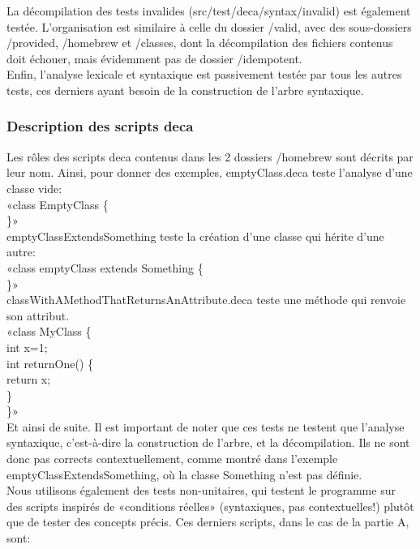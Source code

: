 \documentclass[a4paper]{article}
\begin{document}
La décompilation des tests invalides (src/test/deca/syntax/invalid) est également testée. L'organisation est similaire à celle du dossier /valid, avec des sous-dossiers /provided, /homebrew et  /classes, dont la décompilation des fichiers contenus doit échouer, mais évidemment pas de dossier /idempotent.\\

Enfin, l'analyse lexicale et syntaxique est passivement testée par tous les autres tests, ces derniers ayant besoin de la construction de l'arbre syntaxique.\\

\subsubsection{Description des scripts deca}

Les rôles des scripts deca contenus dans les 2 dossiers /homebrew sont décrits par leur nom.
Ainsi, pour donner des exemples, emptyClass.deca teste l'analyse d'une classe vide:\\
«class EmptyClass \{\\
\}»\\
emptyClassExtendsSomething teste la création d'une classe qui hérite d'une autre:\\
«class emptyClass extends Something \{\\
\}»\\
classWithAMethodThatReturnsAnAttribute.deca teste une méthode qui renvoie son attribut.\\
«class MyClass \{\\
\indent int x=1;\\
\indent int returnOne() \{\\
\indent \indent return x;\\
\indent \}\\
\}»\\

Et ainsi de suite. Il est important de noter que ces tests ne testent que l'analyse syntaxique, c'est-à-dire la construction de l'arbre, et la décompilation. Ils ne sont donc pas corrects contextuellement, comme montré dans l'exemple emptyClassExtendsSomething, où la classe Something n'est pas définie.\\

Nous utilisons également des tests non-unitaires, qui testent le programme sur des scripts inspirés de «conditions réelles» (syntaxiques, pas contextuelles!) plutôt que de tester des concepts précis. Ces derniers scripts, dans le cas de la partie A, sont:\\
\end{document}
